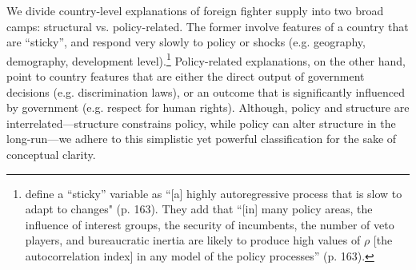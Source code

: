 \documentclass[12pt]{article}
\begin{document}
We divide country-level explanations of foreign fighter supply into two broad camps: structural vs. policy-related. The former involve features of a country that are ``sticky'', and respond very slowly to policy or shocks (e.g. geography, demography, development level).\footnote{\cite{Jackson2012} define a ``sticky'' variable as ``[a] highly autoregressive process that is slow to adapt to changes" (p. 163). They add that ``[in] many policy areas, the influence of interest groups, the security of incumbents, the number of veto players, and bureaucratic inertia are likely to produce high values of $\rho$ [the autocorrelation index] in any model of the policy processes'' (p. 163).} Policy-related explanations, on the other hand, point to country features that are either the direct output of government decisions (e.g. discrimination laws), or an outcome that is significantly influenced by government (e.g. respect for human rights). Although, policy and structure are interrelated---structure constrains policy, while policy can alter structure in the long-run---we adhere to this simplistic yet powerful classification for the sake of conceptual clarity.	\\
\end{document}
